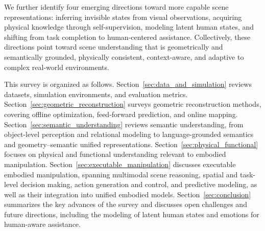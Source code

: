 \documentclass{SCIS2026}
\begin{document}
We further identify four emerging directions toward more capable scene representations: inferring invisible states from visual observations, acquiring physical knowledge through self-supervision, modeling latent human states, and shifting from task completion to human-centered assistance. Collectively, these directions point toward scene understanding that is geometrically and semantically grounded, physically consistent, context-aware, and adaptive to complex real-world environments.

This survey is organized as follows. Section~\ref{sec:data_and_simulation} reviews datasets, simulation environments, and evaluation metrics. Section~\ref{sec:geometric_reconstruction} surveys geometric reconstruction methods, covering offline optimization, feed-forward prediction, and online mapping. Section~\ref{sec:semantic_understanding} reviews semantic understanding, from object-level perception and relational modeling to language-grounded semantics and geometry--semantic unified representations. Section~\ref{sec:physical_functional} focuses on physical and functional understanding relevant to embodied manipulation. Section~\ref{sec:executable_manipulation} discusses executable embodied manipulation, spanning multimodal scene reasoning, spatial and task-level decision making, action generation and control, and predictive modeling, as well as their integration into unified embodied models. Section~\ref{sec:conclusion} summarizes the key advances of the survey and discusses open challenges and future directions, including the modeling of latent human states and emotions for human-aware assistance.
\end{document}
